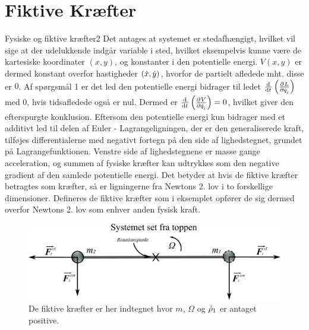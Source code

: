 \section*{Fiktive Kræfter}
%
%
\begin{opgave}{Fysiske og fiktive kræfter}{2}
\opg Det antages at systemet er stedafhængigt, hvilket vil sige at der udelukkende indgår variable i sted, hvilket eksempelvis kunne være de kartesiske koordinater $(x,y)$, og konstanter i den potentielle energi. $V(x,y)$ er dermed konstant overfor hastigheder $(\dt{x},\dt{y})$, hvorfor de partielt afledede mht. disse er $0$.
\opg Af spørgsmål 1 er det led den potentielle energi bidrager til ledet $\el{\dt{q}_i}$ med $0$, hvis tidsafledede også er nul. Dermed er $\dif{t}{}\left(\pdif{\dt{q}_i}{V}\right)=0$, hvilket giver den efterspurgte konklusion.
\opg Eftersom den potentielle energi kun bidrager med et additivt led til delen af Euler \hspace{-0.1cm}- \hspace{-0.1cm}Lagrangeligningen, der er den generaliserede kraft, tilføjes differentialerne med negativt fortegn på den side af lighedstegnet, grundet  på Lagrangefunktionen.
\opg Venstre side af lighedstegnene er masse gange acceleration, og summen af fysiske kræfter kan udtrykkes som den negative gradient af den samlede potentielle energi. Det betyder at hvis de fiktive kræfter betragtes som kræfter, så er ligningerne fra Newtons 2. lov i to forskellige dimensioner. Defineres de fiktive kræfter som i eksemplet opfører de sig dermed overfor Newtons 2. lov som enhver anden fysisk kraft.
\end{opgave}
%
%
\begin{figure}
	\centering
	\includegraphics[width=.9\textwidth]{Analytisk-Mekanik/ToMasserRoterendeStangFiktivekrafter.pdf}
	\caption{De fiktive kræfter er her indtegnet hvor $m$, $\Omega$ og $\dt{\rho}_1$ er antaget positive.} \label{fig:ToMasserRoterendeStangFiktivekraefter}
\end{figure}
%
%
